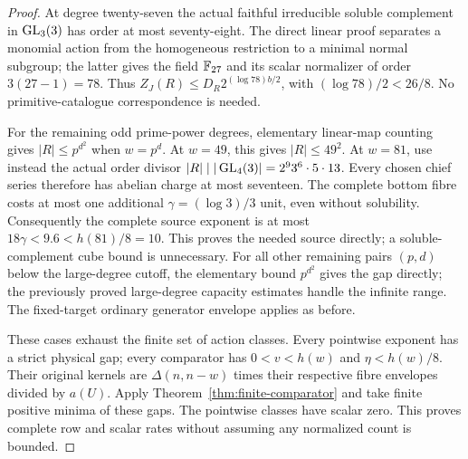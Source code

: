 \begin{proof}
At degree twenty-seven the actual faithful irreducible soluble
complement in $\operatorname{GL}_3(3)$ has order at most seventy-eight. The direct
linear proof separates a monomial action from the homogeneous restriction
to a minimal normal subgroup; the latter gives the field $\mathbb F_{27}$
and its scalar normalizer of order $3(27-1)=78$.
Thus $Z_J(R)\leq D_R2^{(\log78)b/2}$, with
$(\log78)/2<26/8$. No primitive-catalogue correspondence is needed.

For the remaining odd prime-power degrees, elementary linear-map
counting gives $|R|\leq p^{d^2}$ when $w=p^d$. At $w=49$, this gives
$|R|\leq49^2$. At $w=81$, use instead the actual order divisor
$|R|\mid|\operatorname{GL}_4(3)|=2^9 3^6\cdot5\cdot13$.
Every chosen chief series therefore has abelian charge at most seventeen.
The complete bottom fibre costs at most one additional
$\gamma=(\log3)/3$ unit, even without solubility. Consequently the
complete source exponent is at most $18\gamma<9.6<h(81)/8=10$.
This proves the needed source directly; a soluble-complement cube bound
is unnecessary.
For all other remaining pairs $(p,d)$ below the large-degree cutoff,
the elementary bound $p^{d^2}$ gives the gap directly; the previously
proved large-degree capacity estimates handle the infinite range.
The fixed-target ordinary generator envelope applies as before.

These cases exhaust the finite set of action classes. Every
pointwise exponent has a strict physical gap; every comparator
has $0<v<h(w)$ and $\eta<h(w)/8$. Their original kernels
are $\Delta(n,n-w)$ times their respective fibre envelopes
divided by $a(U)$. Apply Theorem~\ref{thm:finite-comparator}
and take finite positive minima of these gaps. The pointwise
classes have scalar zero. This proves complete row and scalar
rates without assuming any normalized count is bounded.
\end{proof}

